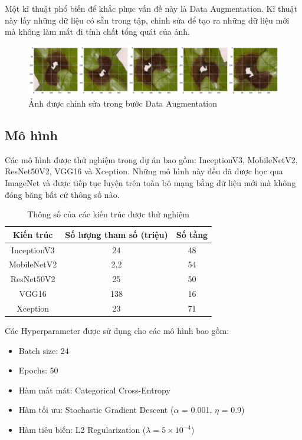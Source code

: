 \documentclass[a4paper,14pt]{extarticle}
\begin{document}
	Một kĩ thuật phổ biến để khắc phục vấn đề này là Data Augmentation. Kĩ thuật này lấy những dữ liệu có sẵn trong tập, chỉnh sửa để tạo ra những dữ liệu mới mà không làm mất đi tính chất tổng quát của ảnh.

	\begin{figure}[H]
		\centering
		\includegraphics[scale=0.25]{images/image2}
		\caption{Ảnh được chỉnh sửa trong bước Data Augmentation}
	\end{figure}

	\subsection{Mô hình}
	Các mô hình được thử nghiệm trong dự án bao gồm: InceptionV3, MobileNetV2, ResNet50V2, VGG16 và Xception. Những mô hình này đều đã được học qua ImageNet và được tiếp tục luyện trên toàn bộ mạng bằng dữ liệu mới mà không đóng băng bất cứ thông số nào.

	\begin{table}[H]
		\centering
		\begin{tabular}{|c|c|c|}
		\hline
		Kiến trúc   & Số lượng tham số (triệu) & Số tầng \\ \hline
		InceptionV3 & 24                       & 48      \\
		MobileNetV2 & 2,2                      & 54      \\
		ResNet50V2  & 25                       & 50      \\
		VGG16       & 138                      & 16      \\
		Xception    & 23                       & 71      \\ \hline
		\end{tabular}

		\caption{Thông số của các kiến trúc được thử nghiệm}
	\end{table}

	Các Hyperparameter được sử dụng cho các mô hình bao gồm:

	\begin{itemize}
		\item Batch size: 24
		\item Epochs: 50
		\item Hàm mất mát: Categorical Cross-Entropy
		\item Hàm tối ưu: Stochastic Gradient Descent ($\alpha$ = 0.001, $\eta$ = 0.9)
		\item Hàm tiêu biến: L2 Regularization ($\lambda = 5 \times 10^{-4}$)
	\end{itemize}
\end{document}
